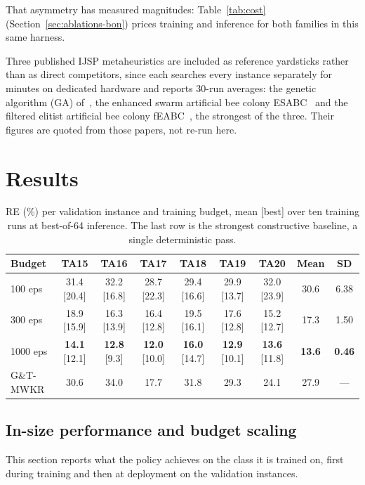 \documentclass[preprint,authoryear,12pt]{elsarticle}
\theoremstyle{definition}
\theoremstyle{remark}
\begin{document}
That asymmetry has measured magnitudes: Table~\ref{tab:cost}
(Section~\ref{sec:ablations-bon}) prices training and inference for
both families in this same harness.

Three published IJSP metaheuristics are included as reference
yardsticks rather than as direct competitors, since each searches
every instance separately for minutes on dedicated hardware and
reports 30-run averages: the genetic algorithm (GA)
of~\citet{DiazGA2020}, the enhanced swarm artificial bee colony
ESABC~\citep{DiazICAE2023} and the filtered elitist artificial bee
colony fEABC~\citep{DiazFEABC2023}, the strongest of the three. Their
figures are quoted from those papers, not re-run here.

\section{Results}
\label{sec:results}

\begin{table}[t]
\centering\small
\caption{RE (\%) per validation instance and training budget, mean
[best] over ten training runs at best-of-64 inference. The last row
is the strongest constructive baseline, a single deterministic pass.}
\label{tab:insize}
\footnotesize
\setlength{\tabcolsep}{3.5pt}
\begin{tabular}{lcccccccc}
\toprule
Budget & TA15 & TA16 & TA17 & TA18 & TA19 & TA20 & Mean & SD \\
\midrule
100 eps & 31.4 [20.4] & 32.2 [16.8] & 28.7 [22.3] & 29.4 [16.6] &
29.9 [13.7] & 32.0 [23.9] & 30.6 & 6.38 \\
300 eps & 18.9 [15.9] & 16.3 [13.9] & 16.4 [12.8] & 19.5 [16.1] &
17.6 [12.8] & 15.2 [12.7] & 17.3 & 1.50 \\
1000 eps & \textbf{14.1} [12.1] & \textbf{12.8} [9.3] &
\textbf{12.0} [10.0] & \textbf{16.0} [14.7] & \textbf{12.9} [10.1] &
\textbf{13.6} [11.8] & \textbf{13.6} & \textbf{0.46} \\
\midrule
G\&T-MWKR & 30.6 & 34.0 & 17.7 & 31.8 & 29.3 & 24.1 & 27.9 & --- \\
\bottomrule
\end{tabular}
\end{table}

\subsection{In-size performance and budget scaling}
\label{sec:results-insize}

This section reports what the policy achieves on the class it is
trained on, first during training and then at deployment on the
validation instances.
\end{document}
